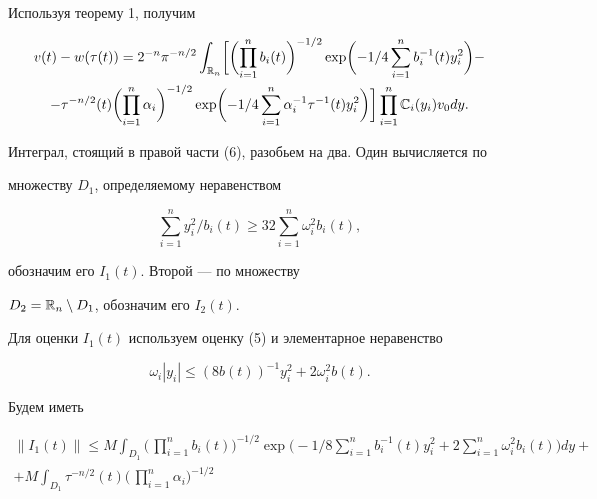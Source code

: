 \begin{pf} Используя теорему 1, получим 


\begin{multline} 


v(t)-w(\tau(t))=2^{-n}\pi^{-n/2}\int_{\Bbb R_n} 


\biggl[\biggl(\prod^n_{i=1}b_i(t)\biggr)^{-1/2} 


\exp\biggl(-1/4\sum^n_{i=1}b_i^{-1}(t)y^2_i\biggr)- \\ 


%


-\tau^{-n/2}(t)\biggl(\prod^n_{i=1}\alpha_i\biggr)^{-1/2} 


\exp\biggl(-1/4\sum^n_{i=1}\alpha_i^{-1}\tau^{-1}(t)y^2_i 


\biggr)\biggr]\prod^n_{i=1}\Bbb C_i(y_i)v_0 dy. 


\end{multline} 


Интеграл, стоящий в правой части (6), разобьем на два. Один вычисляется по 


множеству $D_1$, определяемому неравенством 


$$ 


\sum^n_{i=1}y^2_i/b_i(t) \ge 32\sum^n_{i=1}\omega^2_ib_i(t), 


$$ 


обозначим его $I_1(t)$. Второй --- по множеству 


$D_2=\Bbb R_n\setminus D_1$, обозначим его $I_2(t)$. 


 


Для оценки $I_1(t)$ используем оценку (5) и элементарное неравенство 


\begin{equation} 


\omega_i|y_i| \le (8b(t))^{-1}y^2_i+2\omega^2_ib(t). 


\end{equation} 


Будем иметь 


\begin{multline*} 


\|I_1(t)\| \le M\int_{D_1}\biggl(\,\prod^n_{i=1}b_i(t)\biggr)^{-1/2} 


\exp\biggl(-1/8\sum^n_{i=1}b^{-1}_i(t)y^2_i+2\sum^n_{i=1}\omega^2_ib_i(t) 


\biggr)dy+ \\ 


+M\int_{D_1}\tau^{-n/2}(t)\biggl(\,\prod^n_{i=1}\alpha_i\biggr)^{-1/2}



\end{multline*}
\end{pf}
